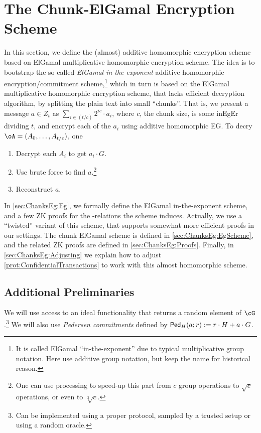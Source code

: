 \section{The Chunk-ElGamal  Encryption Scheme}\label{sec:ChanksEg}
In this section, we define the  (almost) additive homomorphic encryption scheme based on ElGamal multiplicative  homomorphic encryption scheme.  
The idea is to bootstrap the so-called   \textit{ElGamal in-the exponent}   additive homomorphic encryption/commitment  scheme,\footnote{It is called ElGamal ``in-the-exponent'' due to typical multiplicative group notation. Here use additive group notation, but keep the name for historical reason.}  which in turn is based on the  ElGamal multiplicative  homomorphic encryption scheme, that lacks efficient decryption algorithm, by splitting the plain text into small ``chunks''. That  is, we present a message $a\in Z_t$ as $\sum_{i \in (t/c)}   2^{i c} \cdot a_i$, where $c$, the chunk size, is  some inEgEr  dividing $t$, and encrypt each of the $a_i$ using    additive homomorphic EG. To decry $\oA= (A_0,\ldots,A_{t/c})$, one  
\begin{enumerate}
	\item Decrypt   each $A_i$ to get $a_i  \cdot G$.
	\item Use brute force to find $a$.\footnote{One can use    processing to speed-up this part from $c$ group operations to $\sqrt{c}$  operations, or even  to   $\sqrt[3]{c}$.}
	
	\item Reconstruct $a$.
\end{enumerate}
In \cref{sec:ChanksEg:Eg}, we formally define the  ElGamal in-the-exponent scheme, and a few ZK proofs for the \NP-relations the scheme induces. Actually, we use a ``twisted'' variant of this scheme, that supports somewhat more efficient proofs in our settings.   The chunk ElGamal  scheme is defined in \cref{sec:ChanksEg:EgScheme}, and the related ZK proofs are defined in \cref{sec:ChanksEg:Proofs}. Finally, in \cref{sec:ChanksEg:Adjusting} we explain  how to adjust \cref{prot:ConfidentialTransactions} to work with this almost homomorphic scheme.



\subsection{Additional Preliminaries}\label{sec:ChanksEg:Pre}
We will use access to an  ideal functionality \randomH that  returns a random element of $\cG$.\footnote{Can be implemented using a proper protocol,  sampled by a trusted  setup or using a random oracle.} We will also use \textit{Pedersen commitments} defined by $\mathsf{Ped}_H(a;r) := r\cdot H + a \cdot G$. 


